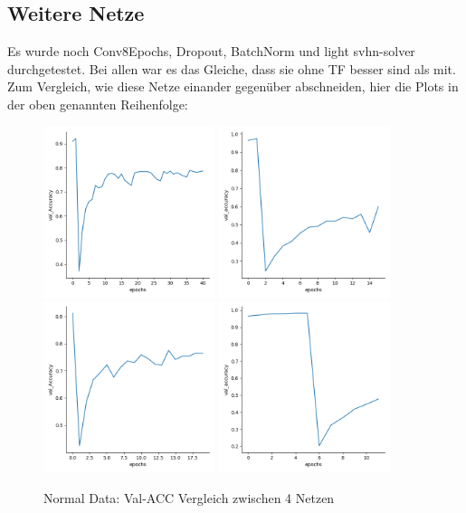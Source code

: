 \subsection{Weitere Netze}
    Es wurde noch Conv8Epochs, Dropout, BatchNorm und light svhn-solver durchgetestet. 
    Bei allen war es das Gleiche, dass sie ohne TF besser sind als mit. Zum Vergleich, wie 
    diese Netze einander gegenüber abschneiden, hier die Plots in der oben genannten Reihenfolge: 
    \begin{figure}[htpb]
        \includegraphics[height=5cm]{../Plots/models_03_C8E/val_Accuracy.png}
        \includegraphics[height=5cm]{../Plots/models_02_DrO/val_Accuracy.png}
        \includegraphics[height=5cm]{../Plots/models_02_BtN/val_Accuracy.png}
        \includegraphics[height=5cm]{../Plots/models_01_Sce/val_Accuracy.png}
        \caption{\label{fig:figure9} Normal Data: Val-ACC Vergleich zwischen 4 Netzen}
    \end{figure}

